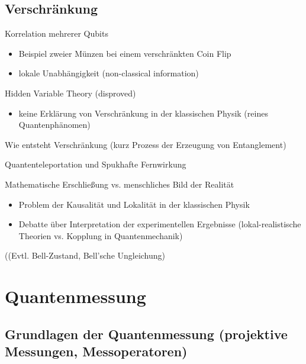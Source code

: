 \subsection{Verschränkung }

Korrelation mehrerer Qubits
\begin{itemize}
    \item Beispiel zweier Münzen bei einem verschränkten Coin Flip
    \item lokale Unabhängigkeit (non-classical information)
\end{itemize}

Hidden Variable Theory (disproved)
\begin{itemize}
    \item keine Erklärung von Verschränkung in der klassischen Physik (reines Quantenphänomen)
\end{itemize}

Wie entsteht Verschränkung (kurz Prozess der Erzeugung von Entanglement)

Quantenteleportation und Spukhafte Fernwirkung

Mathematische Erschließung vs. menschliches Bild der Realität
\begin{itemize}
    \item Problem der Kausalität und Lokalität in der klassischen Physik
    \item Debatte über Interpretation der experimentellen Ergebnisse (lokal-realistische Theorien vs. Kopplung in Quantenmechanik)
\end{itemize}

((Evtl. Bell-Zustand, Bell'sche Ungleichung)

\section{Quantenmessung }
\subsection{Grundlagen der Quantenmessung (projektive Messungen, Messoperatoren)}

